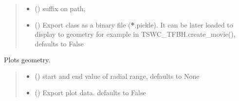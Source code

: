 \documentclass[letterpaper,10pt,english]{sphinxmanual}
\begin{document}
\begin{fulllineitems}
\begin{fulllineitems}
\begin{quote}
\begin{description}
\begin{itemize}
\item {} 
\sphinxAtStartPar
{} () \textendash{} suffix on path,

\item {} 
\sphinxAtStartPar
{} (\sphinxstyleliteralemphasis{\sphinxupquote{, }}) \textendash{} Export class as a binary file ({\color{red}\bfseries{}*}.pickle). It can be later loaded to display to geometry for example in TSWC\_TFBH.create\_movie(), defaults to False

\end{itemize}

\end{description}\end{quote}

\end{fulllineitems}


\begin{fulllineitems}
\label{\detokenize{tscw_module:tscw_module.tscw_DataClassesInput.GacaFieldData.plot_geometry}}
\pysigstartsignatures
{}
\pysigstopsignatures
\sphinxAtStartPar
Plots geometry.
\begin{quote}\begin{description}
\begin{itemize}
\item {} 
\sphinxAtStartPar
{} (\sphinxstyleliteralemphasis{\sphinxupquote{, }}) \textendash{} start and end value of radial range, defaults to None

\item {} 
\sphinxAtStartPar
{} (\sphinxstyleliteralemphasis{\sphinxupquote{, }}) \textendash{} Export plot data. defaults to False


\end{itemize}
\end{description}
\end{quote}
\end{fulllineitems}
\end{fulllineitems}
\end{document}
